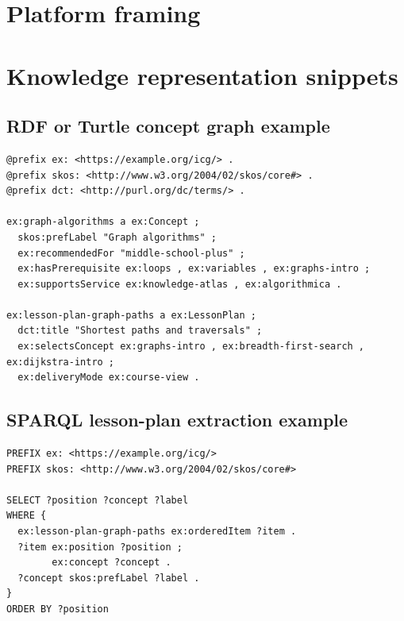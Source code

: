 \section{Platform framing}

\KnowledgePlatformVision

\section{Knowledge representation snippets}

\subsection{RDF or Turtle concept graph example}

\begin{lstlisting}[language=Turtle,caption={Illustrative Turtle snippet for the shared concept network.},label={lst:turtle-concept-network}]
@prefix ex: <https://example.org/icg/> .
@prefix skos: <http://www.w3.org/2004/02/skos/core#> .
@prefix dct: <http://purl.org/dc/terms/> .

ex:graph-algorithms a ex:Concept ;
  skos:prefLabel "Graph algorithms" ;
  ex:recommendedFor "middle-school-plus" ;
  ex:hasPrerequisite ex:loops , ex:variables , ex:graphs-intro ;
  ex:supportsService ex:knowledge-atlas , ex:algorithmica .

ex:lesson-plan-graph-paths a ex:LessonPlan ;
  dct:title "Shortest paths and traversals" ;
  ex:selectsConcept ex:graphs-intro , ex:breadth-first-search , ex:dijkstra-intro ;
  ex:deliveryMode ex:course-view .
\end{lstlisting}

\subsection{SPARQL lesson-plan extraction example}

\begin{lstlisting}[language=SPARQL,caption={Representative SPARQL query for extracting an ordered lesson-plan subset.},label={lst:sparql-lesson-plan}]
PREFIX ex: <https://example.org/icg/>
PREFIX skos: <http://www.w3.org/2004/02/skos/core#>

SELECT ?position ?concept ?label
WHERE {
  ex:lesson-plan-graph-paths ex:orderedItem ?item .
  ?item ex:position ?position ;
        ex:concept ?concept .
  ?concept skos:prefLabel ?label .
}
ORDER BY ?position
\end{lstlisting}

